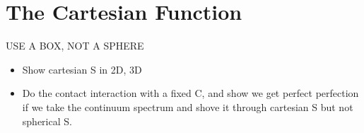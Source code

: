 \section{The Cartesian Function}\label{sec:cartesian}

USE A BOX, NOT A SPHERE

\begin{itemize}
    \item Show cartesian S in 2D, 3D
    \item Do the contact interaction with a fixed C, and show we get perfect perfection if we take the continuum spectrum and shove it through cartesian S but not spherical S.
\end{itemize}
